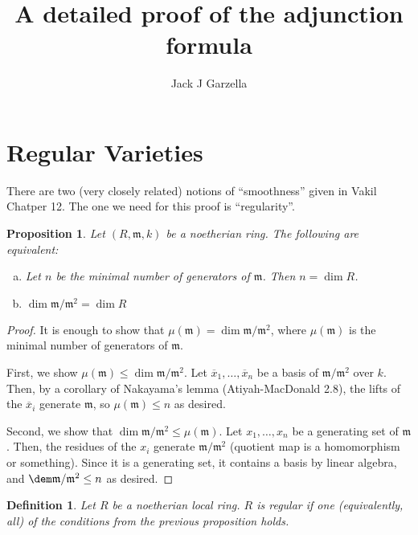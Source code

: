 \documentclass[a4paper]{article}
\title{A detailed proof of the adjunction formula}
\author{Jack J Garzella}
\newtheorem{prop}[thm]{Proposition}
\newtheorem{defn}[thm]{Definition}
\begin{document}
\maketitle

\section{Regular Varieties}

There are two (very closely related)
notions of ``smoothness'' given in Vakil Chatper 12.
The one we need for this proof is ``regularity''.

\begin{prop}
	Let \((R,\mathfrak{m},k)\) be a noetherian ring. 
	The following are equivalent:
	\begin{enumerate}[(a)]
		\item Let \(n\) be the minimal number of generators of
			\(\mathfrak{m}\).
			Then \(n = \dim R\).
		\item \(\dim \mathfrak{m} / \mathfrak{m}^{2}  = \dim R\)
	\end{enumerate}
\end{prop}

\begin{proof}
	It is enough to show that 
	\(\mu(\mathfrak{m}) = \dim \mathfrak{m} / \mathfrak{m}^{2}\),
	where \(\mu(\mathfrak{m})\) is the minimal number of generators
	of \(\mathfrak{m}\).
	
	First, we show \(\mu(\mathfrak{m}) \leq \dim \mathfrak{m} / \mathfrak{m}^{2}\).
	Let \(\overline{x}_{1}, \ldots, \overline{x}_{n}\) 
	be a basis of \(\mathfrak{m} / \mathfrak{m}^{2}\) 
	over \(k\).
	Then, by a corollary of Nakayama's lemma (Atiyah-MacDonald 2.8),
	the lifts of the \(\overline{x}_{i}\) generate \(\mathfrak{m}\),
	so \(\mu(\mathfrak{m}) \leq n\) as desired.

	Second, we show that 
	\(\dim \mathfrak{m} / \mathfrak{m}^{2} \leq \mu(\mathfrak{m})\).
	Let \(x_{1}, \ldots, x_{n}\) be a generating set of 
	\(\mathfrak{m}\).
	Then, the residues of the \(x_{i}\) generate 
	\(\mathfrak{m} / \mathfrak{m}^{2}\) (quotient map is a 
	homomorphism or something).
	Since it is a generating set, it contains a basis by
	linear algebra, and
	\(\dem \mathfrak{m} / \mathfrak{m}^{2} \leq n\) as desired.
\end{proof}


\begin{defn}
	Let \(R\) be a noetherian local ring.
	\(R\) is \textit{regular} if one (equivalently, all)
	of the conditions from the previous proposition holds.
\end{defn}
\end{document}
